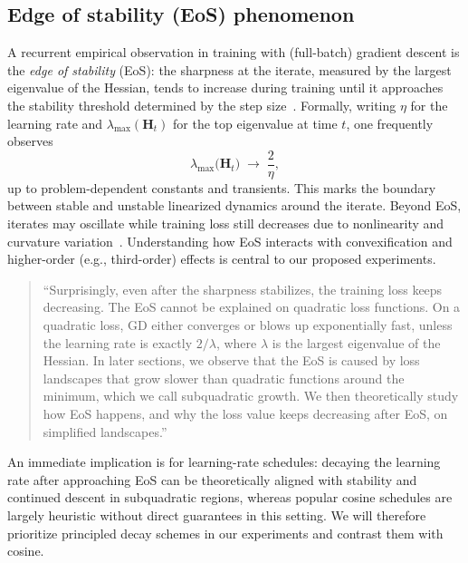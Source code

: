 \documentclass[12pt]{article}
\begin{document}
\subsection{Edge of stability (EoS) phenomenon}\label{sec:eos}
A recurrent empirical observation in training with (full-batch) gradient descent is the \emph{edge of stability} (EoS): the sharpness at the iterate, measured by the largest eigenvalue of the Hessian, tends to increase during training until it approaches the stability threshold determined by the step size~\cite{ma2022quadraticapproximationmultiscalestructure,terjek2025featurelearningedgestability}. Formally, writing \(\eta\) for the learning rate and \(\lambda_{\max}(\bm{H}_{t})\) for the top eigenvalue at time \(t\), one frequently observes
\begin{equation}\label{eq:eos}
\lambda_{\max}\big(\bm{H}_{t}\big) \;\to\; \frac{2}{\eta},
\end{equation}
up to problem-dependent constants and transients. This marks the boundary between stable and unstable linearized dynamics around the iterate. Beyond EoS, iterates may oscillate while training loss still decreases due to nonlinearity and curvature variation~\cite{ma2022quadraticapproximationmultiscalestructure}. Understanding how EoS interacts with convexification and higher-order (e.g., third-order) effects is central to our proposed experiments.

\begin{quote}
\small
“Surprisingly, even after the sharpness stabilizes, the training loss keeps decreasing. The EoS cannot be explained on quadratic loss functions. On a quadratic loss, GD either converges or blows up exponentially fast, unless the learning rate is exactly $2/\lambda$, where $\lambda$ is the largest eigenvalue of the Hessian. In later sections, we observe that the EoS is caused by loss landscapes that grow slower than quadratic functions around the minimum, which we call subquadratic growth. We then theoretically study how EoS happens, and why the loss value keeps decreasing after EoS, on simplified landscapes.”~\cite{ma2022quadraticapproximationmultiscalestructure}
\end{quote}

An immediate implication is for learning-rate schedules: decaying the learning rate after approaching EoS can be theoretically aligned with stability and continued descent in subquadratic regions, whereas popular cosine schedules are largely heuristic without direct guarantees in this setting. We will therefore prioritize principled decay schemes in our experiments and contrast them with cosine.
\end{document}
